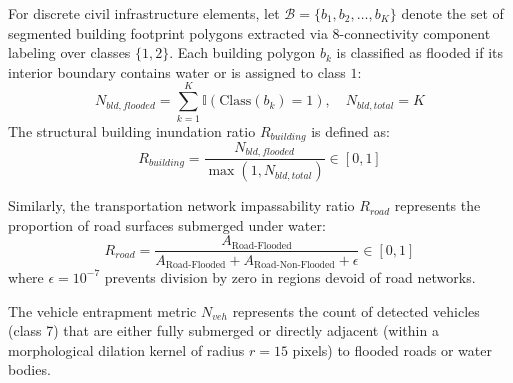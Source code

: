 For discrete civil infrastructure elements, let $\mathcal{B} = \{b_1, b_2, \dots, b_K\}$ denote the set of segmented building footprint polygons extracted via 8-connectivity component labeling over classes $\{1, 2\}$. Each building polygon $b_k$ is classified as flooded if its interior boundary contains water or is assigned to class $1$:
\begin{equation}
    N_{bld, flooded} = \sum_{k=1}^K \mathbb{I}\left( \text{Class}(b_k) = 1 \right), \quad N_{bld, total} = K
\end{equation}
The structural building inundation ratio $R_{building}$ is defined as:
\begin{equation}
    R_{building} = \frac{N_{bld, flooded}}{\max(1, N_{bld, total})} \in [0, 1]
\end{equation}

Similarly, the transportation network impassability ratio $R_{road}$ represents the proportion of road surfaces submerged under water:
\begin{equation}
    R_{road} = \frac{A_{\text{Road-Flooded}}}{A_{\text{Road-Flooded}} + A_{\text{Road-Non-Flooded}} + \epsilon} \in [0, 1]
\end{equation}
where $\epsilon = 10^{-7}$ prevents division by zero in regions devoid of road networks.

The vehicle entrapment metric $N_{veh}$ represents the count of detected vehicles (class 7) that are either fully submerged or directly adjacent (within a morphological dilation kernel of radius $r=15$ pixels) to flooded roads or water bodies.

